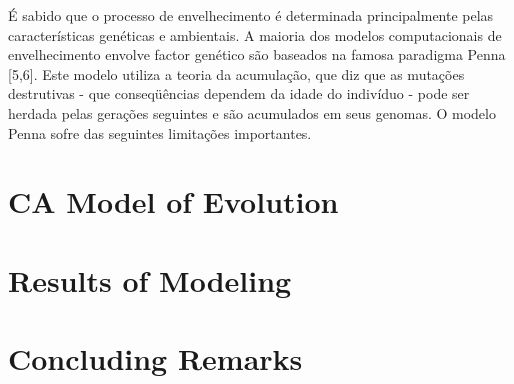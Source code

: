 \documentclass{article}
\begin{document}
É sabido que o processo de envelhecimento é determinada principalmente pelas características genéticas e ambientais. A maioria dos modelos computacionais de envelhecimento envolve factor genético são baseados na famosa paradigma Penna [5,6]. Este modelo utiliza a teoria da acumulação, que diz que as mutações destrutivas - que conseqüências dependem da idade do indivíduo - pode ser herdada pelas gerações seguintes e são acumulados em seus genomas. O modelo Penna sofre das seguintes limitações importantes. 





\section{CA Model of Evolution}




\section{Results of Modeling}




\section{Concluding Remarks}






\end{document}
